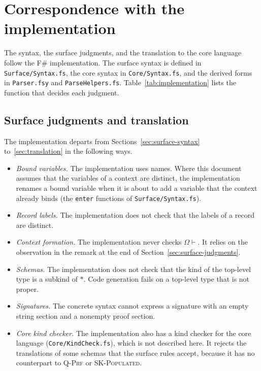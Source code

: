 \documentclass[11pt]{article}
\newcommand{\proper}{\ast}
\newcommand{\rulename}[1]{\textsc{#1}}
\newcommand{\code}[1]{\texttt{#1}}
\theoremstyle{remark}
\begin{document}
\FloatBarrier
\section{Correspondence with the implementation}
\label{sec:implementation}

The syntax, the surface judgments, and the translation to the core language follow the F\#
implementation. The surface syntax is defined in \code{Surface/Syntax.fs}, the core syntax in
\code{Core/Syntax.fs}, and the derived forms in \code{Parser.fsy} and \code{ParseHelpers.fs}.
Table~\ref{tab:implementation} lists the function that decides each judgment.

\subsection{Surface judgments and translation}

The implementation departs from Sections~\ref{sec:surface-syntax}
to~\ref{sec:translation} in the following ways.
\begin{itemize}
\item \emph{Bound variables.} The implementation uses names. Where this document assumes that the
  variables of a context are distinct, the implementation renames a bound variable when it is
  about to add a variable that the context already binds (the \code{enter} functions of
  \code{Surface/Syntax.fs}).
\item \emph{Record labels.} The implementation does not check that the labels of a record are
  distinct.
\item \emph{Context formation.} The implementation never checks $\Omega \vdash$. It relies on the
  observation in the remark at the end of Section~\ref{sec:surface-judgments}.
\item \emph{Schemas.} The implementation does not check that the kind of the top-level type is a
  subkind of $\proper$. Code generation fails on a top-level type that is not proper.
\item \emph{Signatures.} The concrete syntax cannot express a signature with an empty string
  section and a nonempty proof section.
\item \emph{Core kind checker.} The implementation also has a kind checker for the core language
  (\code{Core/KindCheck.fs}), which is not described here. It rejects the translations of some
  schemas that the surface rules accept, because it has no counterpart to \rulename{Q-Prf} or
  \rulename{SK-Populated}.
\end{itemize}
\end{document}
